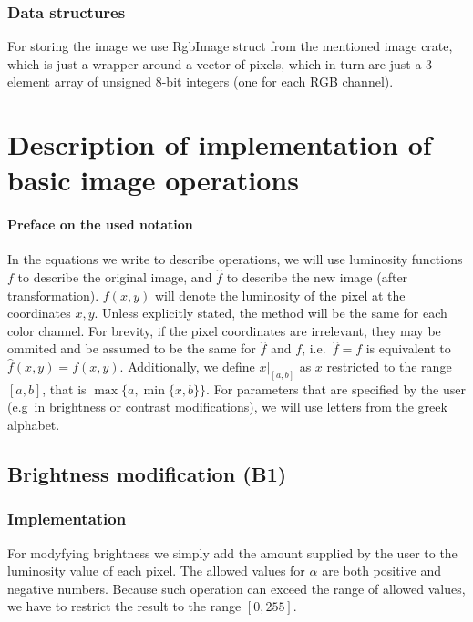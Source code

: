 \documentclass[12pt]{article}
\theoremstyle{definition}
\begin{document}
\subsubsection{Data structures}
For storing the image we use RgbImage struct from the mentioned image crate,
which is just a wrapper around a vector of pixels, which in turn are just a 3-element array of unsigned 8-bit integers (one for each RGB channel).

\section{Description of implementation of basic image operations}

\paragraph*{Preface on the used notation}
In the equations we write to describe operations, we will use luminosity functions $f$ to describe the original image, and $\hat{f}$ to describe the new image (after transformation).
$f(x,y)$ will denote the luminosity of the pixel at the coordinates $x,y$. Unless explicitly stated, the method will be the same for each color channel.
For brevity, if the pixel coordinates are irrelevant, they may be ommited and be assumed to be the same for $\hat{f}$ and $f$, i.e.\ $\hat{f}=f$ is equivalent to $\hat{f}(x,y) = f(x,y)$.
Additionally, we define $x|_{[a,b]}$ as $x$ restricted to the range $[a,b]$, that is $\max\{a, \min\{x,b\}\}$.
For parameters that are specified by the user (e.g\ in brightness or contrast modifications), we will use letters from the greek alphabet.

\vspace{5em}
\subsection{Brightness modification (B1)}

\subsubsection{Implementation}

For modyfying brightness we simply add the amount supplied by the user to the luminosity value of each pixel.
The allowed values for $\alpha$ are both positive and negative numbers.
Because such operation can exceed the range of allowed values, we have to restrict the result to the range $[0,255]$.
\end{document}
